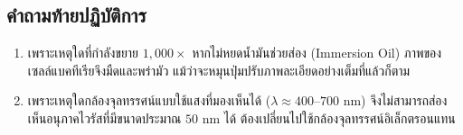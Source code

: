 \subsection{คำถามท้ายปฏิบัติการ}
\begin{enumerate}
    \item เพราะเหตุใดที่กำลังขยาย $1{,}000\times$ หากไม่หยดน้ำมันช่วยส่อง (Immersion Oil) ภาพของเซลล์แบคทีเรียจึงมืดและพร่ามัว แม้ว่าจะหมุนปุ่มปรับภาพละเอียดอย่างเต็มที่แล้วก็ตาม
    \item เพราะเหตุใดกล้องจุลทรรศน์แบบใช้แสงที่มองเห็นได้ ($\lambda \approx 400\text{--}700\text{ nm}$) จึงไม่สามารถส่องเห็นอนุภาคไวรัสที่มีขนาดประมาณ $50\text{ nm}$ ได้ ต้องเปลี่ยนไปใช้กล้องจุลทรรศน์อิเล็กตรอนแทน
\end{enumerate}
